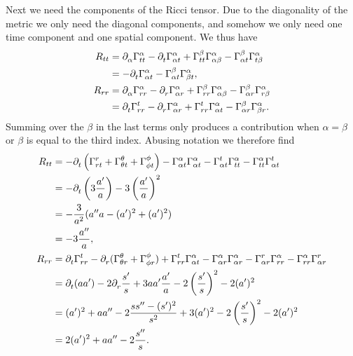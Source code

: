 Next we need the components of the Ricci tensor. Due to the diagonality of the metric we only need the diagonal components, and somehow we only need one time component and one spatial component. We thus have
\begin{align*}
	R_{tt} &= \del{\alpha}{\chris{\alpha}{t}{t}} - \del{t}{\chris{\alpha}{\alpha}{t}} + \chris{\beta}{t}{t}\chris{\alpha}{\alpha}{\beta} - \chris{\beta}{\alpha}{t}\chris{\alpha}{t}{\beta} \\
	       &=  -\del{t}{\chris{\alpha}{\alpha}{t}} - \chris{\beta}{\alpha}{t}\chris{\alpha}{\beta}{t}, \\
	R_{rr} &= \del{\alpha}{\chris{\alpha}{r}{r}} - \del{r}{\chris{\alpha}{\alpha}{r}} + \chris{\beta}{r}{r}\chris{\alpha}{\alpha}{\beta} - \chris{\beta}{\alpha}{r}\chris{\alpha}{r}{\beta} \\
	       &= \del{t}{\chris{t}{r}{r}} - \del{r}{\chris{\alpha}{\alpha}{r}} + \chris{t}{r}{r}\chris{\alpha}{\alpha}{t} - \chris{\beta}{\alpha}{r}\chris{\alpha}{\beta}{r}.
\end{align*}
Summing over the $\beta$ in the last terms only produces a contribution when $\alpha = \beta$ or $\beta$ is equal to the third index. Abusing notation we therefore find
\begin{align*}
	R_{tt} &= -\del{t}{\left(\chris{r}{r}{t} + \chris{\theta}{\theta}{t} + \chris{\phi}{\phi}{t}\right)} - \chris{\alpha}{\alpha}{t}\chris{\alpha}{\alpha}{t} - \chris{t}{\alpha}{t}\chris{\alpha}{t}{t} - \chris{\alpha}{t}{t}\chris{t}{\alpha}{t} \\
	       &= -\del{t}{\left(3\frac{a\p}{a}\right)} - 3\left(\frac{a\p}{a}\right)^{2} \\
	       &= -\frac{3}{a^{2}}(a\pp a - (a\p)^{2} + (a\p)^{2}) \\
	       &= -3\frac{a\pp}{a}, \\
	R_{rr} &= \del{t}{\chris{t}{r}{r}} - \del{r}{(\chris{\theta}{\theta}{r} + \chris{\phi}{\phi}{r})} + \chris{t}{r}{r}\chris{\alpha}{\alpha}{t} - \chris{\alpha}{\alpha}{r}\chris{\alpha}{\alpha}{r} - \chris{r}{\alpha}{r}\chris{\alpha}{r}{r} - \chris{\alpha}{r}{r}\chris{r}{\alpha}{r} \\
	       &= \del{t}{(aa\p)} - 2\del{r}{\frac{s\p}{s}} + 3aa\p\frac{a\p}{a} - 2\left(\frac{s\p}{s}\right)^{2} - 2(a\p)^{2} \\
	       &= (a\p)^{2} + aa\pp - 2\frac{ss\pp - (s\p)^{2}}{s^{2}} + 3(a\p)^{2} - 2\left(\frac{s\p}{s}\right)^{2}- 2(a\p)^{2} \\
	       &= 2(a\p)^{2} + aa\pp - 2\frac{s\pp}{s}.
\end{align*}


